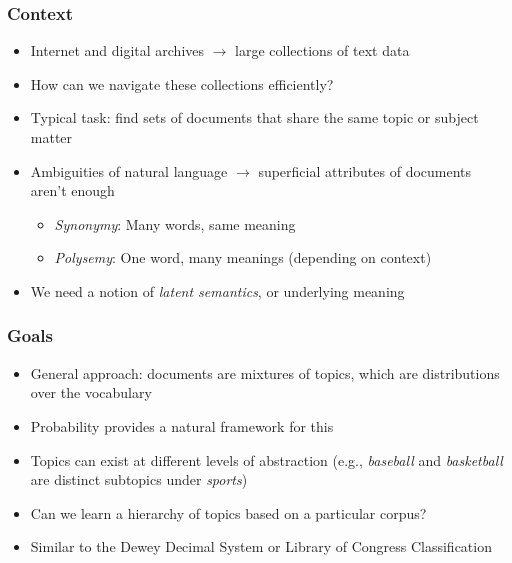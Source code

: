 \begin{frame}
\frametitle{Context}
\begin{itemize}[<+->]
\item Internet and digital archives $\rightarrow$ large collections of text data
\item How can we navigate these collections efficiently?
\item Typical task: find sets of documents that share the same topic or subject matter
\item Ambiguities of natural language $\rightarrow$ superficial attributes of documents aren't enough
    \begin{itemize}[<+->]
    \item \emph{Synonymy}: Many words, same meaning
    \item \emph{Polysemy}: One word, many meanings (depending on context)
    \end{itemize}
\item We need a notion of \emph{latent semantics}, or underlying meaning
\end{itemize}
\end{frame}

\begin{frame}
\frametitle{Goals}
\begin{itemize}[<+->]
\item General approach: documents are mixtures of topics, which are distributions over the vocabulary
\item Probability provides a natural framework for this
\item Topics can exist at different levels of abstraction (e.g., \emph{baseball} and \emph{basketball} are distinct subtopics under \emph{sports})
\item Can we learn a hierarchy of topics based on a particular corpus?
\item Similar to the Dewey Decimal System or Library of Congress Classification
\end{itemize}
\end{frame}

